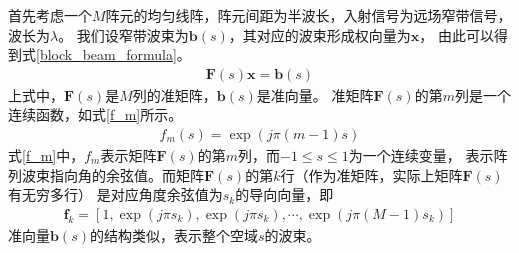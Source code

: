 \documentclass[master]{thesis-uestc}
\begin{document}
首先考虑一个$M$阵元的均匀线阵，阵元间距为半波长，入射信号为远场窄带信号，波长为$\lambda$。
我们设窄带波束为$\bm{b}(s)$，其对应的波束形成权向量为$\bm{x}$，
由此可以得到式\eqref{block_beam_formula}。
\begin{equation}\label{block_beam_formula}
    \begin{aligned}
        \bm{F}(s)\bm{x} = \bm{b}(s)
    \end{aligned}
\end{equation}
上式中，$\bm{F}(s)$是$M$列的准矩阵，$\bm{b}(s)$是准向量。
准矩阵$\bm{F}(s)$的第$m$列是一个连续函数，如式\eqref{f_m}所示。
\begin{equation}\label{f_m}
    \begin{aligned}
        f_m(s) = \exp\left(j\pi(m-1)s\right)
    \end{aligned}
\end{equation}
式\eqref{f_m}中，$f_m$表示矩阵$\bm{F}(s)$的第$m$列，而$-1\le s \le 1$为一个连续变量，
表示阵列波束指向角的余弦值。而矩阵$\bm{F}(s)$的第$k$行（作为准矩阵，实际上矩阵$\bm{F}(s)$有无穷多行）
是对应角度余弦值为$s_k$的导向向量，即
\begin{equation}\label{f_k}
    \begin{aligned}
        \bm{f}_k = \left[1, \exp\left(j\pi s_k\right), \exp\left(j\pi s_k\right), \cdots,
                   \exp\left(j\pi(M-1)s_k\right)
                   \right]
    \end{aligned}
\end{equation}
准向量$\bm{b}(s)$的结构类似，表示整个空域$s$的波束。
\end{document}

